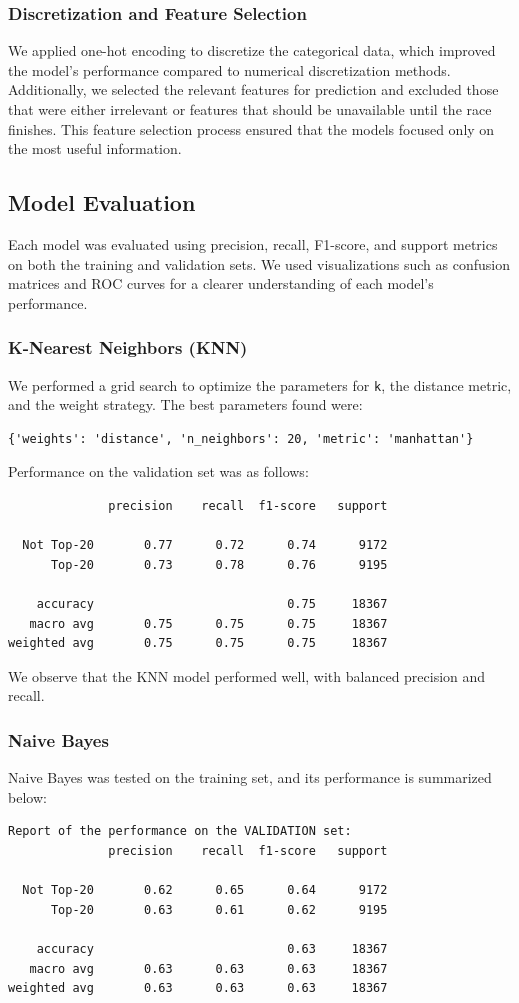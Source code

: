 \documentclass{article}
\begin{document}
\subsubsection{Discretization and Feature Selection}
We applied one-hot encoding to discretize the categorical data, which improved the model's performance compared to numerical discretization methods. Additionally, we selected the relevant features for prediction and excluded those that were either irrelevant or features that should be unavailable until the race finishes. This feature selection process ensured that the models focused only on the most useful information.

\subsection{Model Evaluation}
Each model was evaluated using precision, recall, F1-score, and support metrics on both the training and validation sets. We used visualizations such as confusion matrices and ROC curves for a clearer understanding of each model's performance.

\subsubsection{K-Nearest Neighbors (KNN)}
We performed a grid search to optimize the parameters for \texttt{k}, the distance metric, and the weight strategy. The best parameters found were:
\begin{verbatim}
{'weights': 'distance', 'n_neighbors': 20, 'metric': 'manhattan'}
\end{verbatim}

Performance on the validation set was as follows:
\begin{verbatim}
              precision    recall  f1-score   support

  Not Top-20       0.77      0.72      0.74      9172
      Top-20       0.73      0.78      0.76      9195

    accuracy                           0.75     18367
   macro avg       0.75      0.75      0.75     18367
weighted avg       0.75      0.75      0.75     18367
\end{verbatim}

We observe that the KNN model performed well, with balanced precision and recall.

\subsubsection{Naive Bayes}
Naive Bayes was tested on the training set, and its performance is summarized below:
\begin{verbatim}
Report of the performance on the VALIDATION set:
              precision    recall  f1-score   support

  Not Top-20       0.62      0.65      0.64      9172
      Top-20       0.63      0.61      0.62      9195

    accuracy                           0.63     18367
   macro avg       0.63      0.63      0.63     18367
weighted avg       0.63      0.63      0.63     18367
\end{verbatim}
\end{document}

